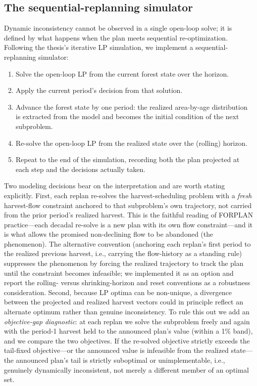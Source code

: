\hypertarget{the-sequential-replanning-simulator}{%
\subsection{The sequential-replanning simulator}\label{the-sequential-replanning-simulator}}

Dynamic inconsistency cannot be observed in a single open-loop solve; it is defined by what happens when the plan meets sequential re-optimization. Following the thesis's iterative LP simulation, we implement a sequential-replanning simulator:

\begin{enumerate}
\def\labelenumi{\arabic{enumi}.}
\tightlist
\item
  Solve the open-loop LP from the current forest state over the horizon.
\item
  Apply the current period's decision from that solution.
\item
  Advance the forest state by one period: the realized area-by-age distribution is extracted from the model and becomes the initial condition of the next subproblem.
\item
  Re-solve the open-loop LP from the realized state over the (rolling) horizon.
\item
  Repeat to the end of the simulation, recording both the plan projected at each step and the decisions actually taken.
\end{enumerate}

Two modeling decisions bear on the interpretation and are worth stating explicitly. First, each replan re-solves the harvest-scheduling problem with a \emph{fresh} harvest-flow constraint anchored to that subproblem's own trajectory, not carried from the prior period's realized harvest. This is the faithful reading of FORPLAN practice---each decadal re-solve is a new plan with its own flow constraint---and it is what allows the promised non-declining flow to be abandoned (the phenomenon). The alternative convention (anchoring each replan's first period to the realized previous harvest, i.e., carrying the flow-history as a standing rule) suppresses the phenomenon by forcing the realized trajectory to track the plan until the constraint becomes infeasible; we implemented it as an option and report the rolling- versus shrinking-horizon and reset conventions as a robustness consideration. Second, because LP optima can be non-unique, a divergence between the projected and realized harvest vectors could in principle reflect an alternate optimum rather than genuine inconsistency. To rule this out we add an \emph{objective-gap diagnostic}: at each replan we solve the subproblem freely and again with the period-1 harvest held to the announced plan's value (within a 1\% band), and we compare the two objectives. If the re-solved objective strictly exceeds the tail-fixed objective---or the announced value is infeasible from the realized state---the announced plan's tail is strictly suboptimal or unimplementable, i.e., genuinely dynamically inconsistent, not merely a different member of an optimal set.

